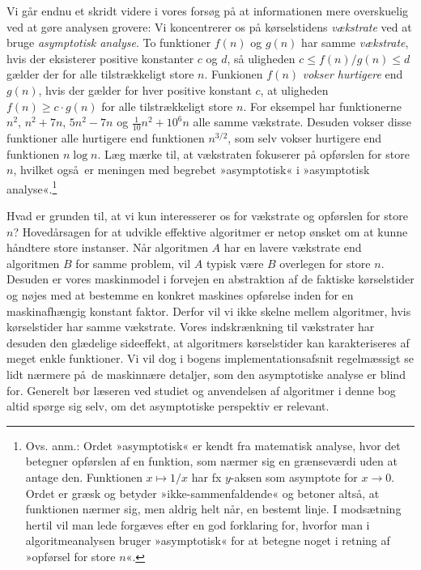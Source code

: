 Vi går endnu et skridt videre i vores forsøg på at informationen mere overskuelig ved at gøre analysen grovere:
Vi koncentrerer os på kørselstidens \emph{vækstrate} ved at bruge \emph{asymptotisk analyse}.
To funktioner $f(n)$ og $g(n)$ har samme 
\emph{vækstrate}, hvis der eksisterer positive konstanter $c$ og $d$, så uligheden $c\le f(n)/g(n)\le d$ gælder der for alle tilstrækkeligt store $n$.
Funkionen $f(n)$ \emph{vokser hurtigere} end $g(n)$, hvis der gælder for hver positive konstant $c$, at uligheden $f(n)\ge c\cdot g(n)$ for alle tilstrækkeligt store $n$.
For eksempel har funktionerne $n^2$, $n^2 + 7n$, $5n^2 - 7n$ og
$\frac{1}{10}n^2 + 10^6 n$ alle samme vækstrate.
Desuden vokser disse funktioner alle hurtigere end funktionen $n^{3/2}$, som selv vokser hurtigere end funktionen  $n \log n$.
Læg mærke til, at vækstraten fokuserer på opførslen for store $n$, hvilket også er meningen med begrebet »asymptotisk« i »asymptotisk analyse«.\footnote{Ovs. anm.:
Ordet »asymptotisk« er kendt fra matematisk analyse, hvor det betegner opførslen af en funktion, som nærmer sig en grænseværdi uden at antage den.
Funktionen $x\mapsto 1/x$ har fx $y$-aksen som asymptote for $x\rightarrow 0$.
Ordet er græsk og betyder »ikke-sammenfaldende« og betoner altså, at funktionen nærmer sig, men aldrig helt når, en bestemt linje.
I modsætning hertil vil man lede forgæves efter en god forklaring for, hvorfor man i algoritmeanalysen bruger »asymptotisk« for at betegne noget i retning af »opførsel for store $n$«.}

Hvad er grunden til, at vi kun interesserer os for vækstrate og opførslen for store $n$?
Hovedårsagen for at udvikle effektive algoritmer er netop ønsket om at kunne håndtere store instanser.
Når algoritmen $A$ har en lavere vækstrate end algoritmen $B$ for samme problem, vil $A$ typisk være $B$ overlegen for store $n$.
Desuden er vores maskinmodel 
i forvejen en abstraktion af de faktiske kørselstider og nøjes med at bestemme en konkret maskines opførelse inden for en maskinafhængig konstant faktor.
Derfor vil vi ikke skelne mellem algoritmer, hvis kørselstider har samme vækstrate.
Vores indskrænkning til vækstrater har desuden den glædelige sideeffekt, at algoritmers kørselstider kan karakteriseres af meget enkle funktioner.
Vi vil dog i bogens implementationsafsnit regelmæssigt se lidt nærmere på de maskinnære detaljer, som den asymptotiske analyse er blind for. 
Generelt bør læseren ved studiet og anvendelsen af algoritmer i denne bog altid spørge sig selv, om det asymptotiske perspektiv er relevant.

